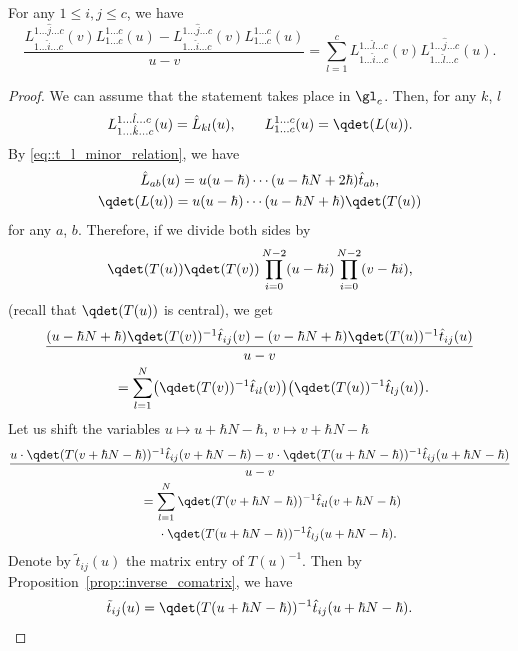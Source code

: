 	\begin{Proposition}
		\label{prop::inv_qdet_sum}
		For any $1\leq i,j \leq c$, we have
		\[
		\frac{L_{1\dots \hat{i} \dots c}^{1\dots \hat{j} \dots c}(v) L_{1\dots c}^{1\dots c}(u) - L_{1\dots \hat{i} \dots c}^{1\dots \hat{j} \dots c}(v) L_{1\dots c}^{1\dots c}(u)}{u-v} = \sum\limits_{l=1}^c L_{1\dots \hat {i} \dots c}^{1\dots \hat{l} \dots c}(v) L_{1\dots \hat{l} \dots c}^{1\dots \hat{j} \dots c}(u).
		\]
		
		\begin{proof}
			We can assume that the statement takes place in $\gl_c$. Then, for any $k$, $l$
			\[
				L_{1\dots \hat{k} \dots c}^{1\dots \hat{l} \dots c}(u) = \hat{L}_{kl}(u), \qquad
				L_{1\dots c}^{1\dots c}(u) = \qdet(L(u)).
			\]
			By \eqref{eq::t_l_minor_relation}, we have
			\begin{gather*}
				\hat{L}_{ab}(u) = u(u-\hbar)\cdots (u-\hbar N + 2\hbar) \hat{t}_{ab}, \\
				\qdet(L(u)) = u(u-\hbar) \cdots (u-\hbar N+\hbar) \qdet(T(u))
			\end{gather*}
			for any $a$, $b$. Therefore, if we divide both sides by
			\[
			\qdet(T(u)) \qdet(T(v)) \prod\limits_{i=0}^{N-2} (u - \hbar i) \prod\limits_{i=0}^{N-2} (v - \hbar i),
			\]
			(recall that $\qdet(T(u))$ is central), we get
			\begin{gather*}
				\frac{(u-\hbar N+\hbar) \qdet(T(v))^{-1} \hat{t}_{ij}(v) - (v-\hbar N+ \hbar) \qdet(T(u))^{-1}\hat{t}_{ij}(u)}{u-v} \\
				\qquad= \sum\limits_{l=1}^N \bigl(\qdet(T(v))^{-1} \hat{t}_{il}(v)\bigr) \bigl(\qdet(T(u))^{-1} \hat{t}_{lj}(u)\bigr).
			\end{gather*}
			Let us shift the variables $u \mapsto u + \hbar N-\hbar$, $v \mapsto v + \hbar N-\hbar$
			\begin{gather*}
				\frac{u\cdot \qdet(T(v + \hbar N - \hbar))^{-1} \hat{t}_{ij}(v + \hbar N-\hbar) - v \cdot \qdet(T(u + \hbar N-\hbar))^{-1}\hat{t}_{ij}(u + \hbar N-\hbar)}{u-v} \\
				\qquad= \sum\limits_{l=1}^N \qdet(T(v + \hbar N-\hbar))^{-1} \hat{t}_{il}(v + \hbar N-\hbar)\\
\phantom{\qquad=}{}\cdot \qdet(T(u + \hbar N-\hbar))^{-1} \hat{t}_{lj}(u + \hbar N-\hbar).
			\end{gather*}
			Denote by $\tilde{t}_{ij}(u)$ the matrix entry of $T(u)^{-1}$. Then by Proposition~\ref{prop::inverse_comatrix}, we have
			\[
			\tilde{t}_{ij}(u) = \qdet(T(u + \hbar N-\hbar))^{-1} \hat{t}_{ij} (u + \hbar N-\hbar ).
\]
\end{proof}
\end{Proposition}
